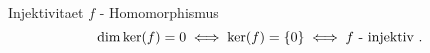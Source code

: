 \documentclass[class=article, crop=false]{standalone}
\begin{document}
\begin{zettel}{Injektivitaet}
    $f$ - Homomorphismus
\[
    \dim\ker(f) = 0 \iff \ker (f) = \set{0} \iff f \text{ - injektiv }
.\]

\end{zettel}
\end{document}
